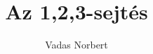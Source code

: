 \documentclass[12pt, a4paper]{report}
\author{Vadas Norbert}
\title{Az 1,2,3-sejtés}
\date{}
\begin{document}
\maketitle



\nocite{*}
\printbibliography
\end{document}
